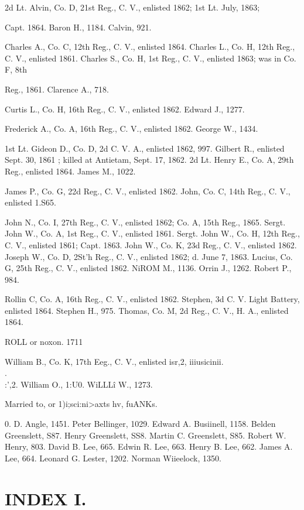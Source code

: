 \documentclass{book}
\begin{document}
2d Lt. Alvin, Co. D, 21st Reg., C. V., enlisted 1862; 1st Lt. July, 1863; 

Capt. 1864. 
Baron H., 1184. 
Calvin, 921. 

Charles A., Co. C, 12th Reg., C. V., enlisted 1864. 
Charles L., Co. H, 12th Reg., C. V., enlisted 1861. 
Charles S., Co. H, 1st Reg., C. V., enlisted 1863; was in Co. F, 8th 

Reg., 1861. 
Clarence A., 718. 

Curtis L., Co. H, 16th Reg., C. V., enlisted 1862. 
Edward J., 1277. 

Frederick A., Co. A, 16th Reg., C. V., enlisted 1862. 
George W., 1434. 

1st Lt. Gideon D., Co. D, 2d C. V. A., enlisted 1862, 997. 
Gilbert R., enlisted Sept. 30, 1861 ; killed at Antietam, Sept. 17, 1862. 
2d Lt. Henry E., Co. A, 29th Reg., enlisted 1864. 
James M., 1022. 

James P., Co. G, 22d Reg., C. V., enlisted 1862. 
John, Co. C, 14th Reg., C. V., enlisted 1.S65. 

John N., Co. I, 27th Reg., C. V., enlisted 1862; Co. A, 15th Reg., 1865. 
Sergt. John W., Co. A, 1st Reg., C. V., enlisted 1861. 
Sergt. John W., Co. H, 12th Reg., C. V., enlisted 1861; Capt. 1863. 
John W., Co. K, 23d Reg., C. V., enlisted 1862. 
Joseph W., Co. D, 2St'h Reg., C. V., enlisted 1862; d. June 7, 1863. 
Lucius, Co. G, 25th Reg., C. V., enlisted 1862. 
NiROM M., 1136. 
Orrin J., 1262. 
Robert P., 984. 

Rollin C, Co. A, 16th Reg., C. V., enlisted 1862. 
Stephen, 3d C. V. Light Battery, enlisted 1864. 
Stephen H., 975. 
Thomas, Co. M, 2d Reg., C. V., H. A., enlisted 1864. 



ROLL or noxon. 1711 

William B., Co. K, 17th Eeg., C. V., enlisted isr,2, iiiusicinii. \\.\\:',2. 
William O., 1:U0. 
WiLLL\^i W., 1273. 

Married to, or 1)i;sci:ni>axts hv, fuANKs. 

0. D. Angle, 1451. 
Peter Bellinger, 1029. 
Edward A. Busiinell, 1158. 
Belden Greenslett, S87. 
Henry Greenslett, SS8. 
Martin C. Greenslett, S85. 
Robert W. Henry, 803. 
David B. Lee, 665. 
Edwin R. Lee, 663. 
Henry B. Lee, 662. 
James A. Lee, 664. 
Leonard G. Lester, 1202. 
Norman Wiieelock, 1350. 



\chapter{INDEX I.}
\end{document}
